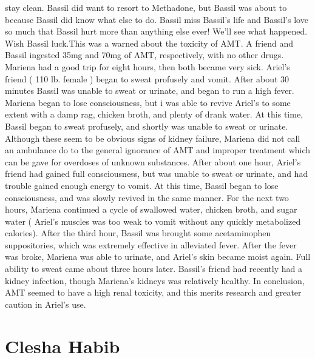 \documentclass[12pt]{book}
\begin{document}
stay clean. Bassil did want to resort to Methadone, but Bassil was about to because Bassil did know what else to do. Bassil miss Bassil's life and Bassil's love so much that Bassil hurt more than anything else ever! We'll see what happened. Wish Bassil luck.This was a warned about the toxicity of AMT. A friend and Bassil ingested 35mg and 70mg of AMT, respectively, with no other drugs. Mariena had a good trip for eight hours, then both became very sick. Ariel's friend ( 110 lb. female ) began to sweat profusely and vomit. After about 30 minutes Bassil was unable to sweat or urinate, and began to run a high fever. Mariena began to lose consciousness, but i was able to revive Ariel's to some extent with a damp rag, chicken broth, and plenty of drank water. At this time, Bassil began to sweat profusely, and shortly was unable to sweat or urinate. Although these seem to be obvious signs of kidney failure, Mariena did not call an ambulance do to the general ignorance of AMT and improper treatment which can be gave for overdoses of unknown substances. After about one hour, Ariel's friend had gained full consciousness, but was unable to sweat or urinate, and had trouble gained enough energy to vomit. At this time, Bassil began to lose consciousness, and was slowly revived in the same manner. For the next two hours, Mariena continued a cycle of swallowed water, chicken broth, and sugar water ( Ariel's muscles was too weak to vomit without any quickly metabolized calories). After the third hour, Bassil was brought some acetaminophen suppositories, which was extremely effective in alleviated fever. After the fever was broke, Mariena was able to urinate, and Ariel's skin became moist again. Full ability to sweat came about three hours later. Bassil's friend had recently had a kidney infection, though Mariena's kidneys was relatively healthy. In conclusion, AMT seemed to have a high renal toxicity, and this merits research and greater caution in Ariel's use.



\chapter{Clesha Habib}
\end{document}
